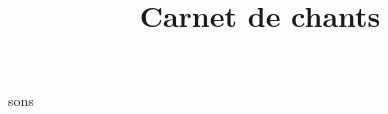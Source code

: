 \documentclass{article}
\title{Carnet de chants}
\begin{document}
\maketitle
{}


\begin{songs}{sons}

\end{songs}
\end{document}
